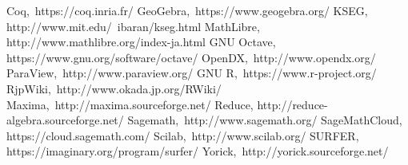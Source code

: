 \begin{thebibliography}{99}
Coq,~https://coq.inria.fr/
GeoGebra,~https://www.geogebra.org/
KSEG,
\newline
http://www.mit.edu/~ibaran/kseg.html
MathLibre,
\newline
http://www.mathlibre.org/index-ja.html
GNU Octave,
\newline
https://www.gnu.org/software/octave/
OpenDX,~http://www.opendx.org/
ParaView,~http://www.paraview.org/
GNU R,~https://www.r-project.org/
RjpWiki,~http://www.okada.jp.org/RWiki/
Maxima,~http://maxima.sourceforge.net/
Reduce,\newline
http://reduce-algebra.sourceforge.net/
Sagemath,~http://www.sagemath.org/
SageMathCloud,\newline
https://cloud.sagemath.com/
Scilab,~http://www.scilab.org/
SURFER,\newline
https://imaginary.org/program/surfer/
Yorick,~http://yorick.sourceforge.net/
\end{thebibliography}
